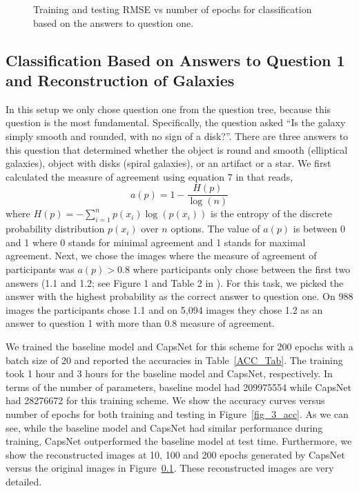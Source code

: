 \documentclass[a4paper,fleqn,usenatbib]{mnras}
\begin{document}
 \begin{figure*}
	\centering
 	\hfil 
    \caption{Training and testing RMSE vs number of epochs for classification based on the answers to question one.}
    \label{fig_rmse}
\end{figure*}
\subsection{Classification Based on Answers to Question 1 and Reconstruction of Galaxies}\label{Reconst}
In this setup we only chose question one from the question tree, because this question is the most fundamental. Specifically, the question asked ``Is the galaxy simply smooth and rounded, with no sign of a disk?''. There are three answers to this question that determined whether the object is round and smooth (elliptical galaxies), object with disks (spiral galaxies), or an artifact or a star. We first calculated the measure of agreement using equation 7 in \cite{dieleman2015rotation} that reads, 
\begin{equation}
a(p) = 1 - \frac{H(p)}{\log(n)}
\end{equation}
where $H(p) = - \sum_{i=1}^{n}p(x_{i}) \log(p(x_{i}))$ is the entropy of the discrete probability distribution $p(x_{i})$ over $n$ options. The value of $a(p)$ is between 0 and 1 where 0 stands for minimal agreement and 1 stands for maximal agreement. Next, we chose the images where the measure of agreement of participants was $a(p) > 0.8$ where participants only chose between the first two answers (1.1 and 1.2; see Figure 1 and Table 2 in \cite{willett2013galaxy}). For this task, we picked the answer with the highest probability as the correct answer to question one. On 988 images the participants chose 1.1 and on 5,094 images they chose 1.2 as an answer to question 1 with more than 0.8 measure of agreement. 
 
We trained the baseline model and CapsNet for this scheme for 200 epochs with a batch size of 20 and reported the accuracies in Table~\ref{ACC_Tab}. The training took 1 hour and 3 hours for the baseline model and CapsNet, respectively. In terms of the number of parameters, baseline model had \num[group-separator={,}]{209975554} while CapsNet had \num[group-separator={,}]{28276672} for this training scheme. We show the accuracy curves versus number of epochs for both training and testing in Figure~\ref{fig_3_acc}. As we can see, while the baseline model and CapsNet had similar performance during training, CapsNet outperformed the baseline model at test time. Furthermore, we show the reconstructed images at 10, 100 and 200 epochs generated by CapsNet versus the original images in Figure~\ref{Reconst}. These reconstructed images are very detailed.  
\end{document}
